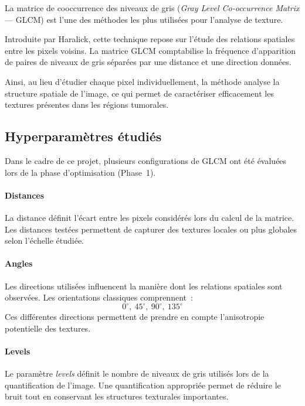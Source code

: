 La matrice de cooccurrence des niveaux de gris (\emph{Gray Level Co-occurrence Matrix} --- GLCM)
est l'une des méthodes les plus utilisées pour l'analyse de texture.

Introduite par Haralick, cette technique repose sur l'étude des relations spatiales entre les
pixels voisins. La matrice GLCM comptabilise la fréquence d'apparition de paires de niveaux de
gris séparées par une distance et une direction données.

Ainsi, au lieu d'étudier chaque pixel individuellement, la méthode analyse la structure
spatiale de l'image, ce qui permet de caractériser efficacement les textures présentes dans les
régions tumorales.

\subsection{Hyperparamètres étudiés}

Dans le cadre de ce projet, plusieurs configurations de GLCM ont été évaluées lors de la phase
d'optimisation (Phase~1).

\paragraph{Distances}
La distance définit l'écart entre les pixels considérés lors du calcul de la matrice. Les
distances testées permettent de capturer des textures locales ou plus globales selon l'échelle
étudiée.

\paragraph{Angles}
Les directions utilisées influencent la manière dont les relations spatiales sont observées.
Les orientations classiques comprennent~:
\begin{equation}
  0^\circ,\ 45^\circ,\ 90^\circ,\ 135^\circ
\end{equation}
Ces différentes directions permettent de prendre en compte l'anisotropie potentielle des
textures.

\paragraph{Levels}
Le paramètre \emph{levels} définit le nombre de niveaux de gris utilisés lors de la
quantification de l'image. Une quantification appropriée permet de réduire le bruit tout en
conservant les structures texturales importantes.

